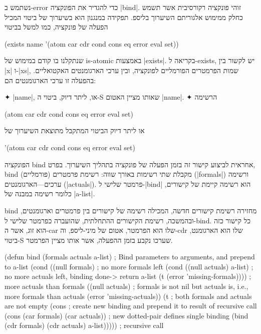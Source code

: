 נשתמש ב-error כדי להגדיר את הפונקציה \E|bind|. זוהי פונקציה רקורסיבית אשר תשמש כחלק
ממימוש אלגוריתם השיערוך בליספ. תפקידה במנגנון הוא בשיערוך של ביטוי המכיל הפעלה
של פונקציה, כמו למשל בביטוי 
\begin{LISP}
  (exists name '(atom car cdr cond cons eq error eval set))
\end{LISP}
שנתקלנו בו קודם במימוש של is-atomic באמצעות  \E|exists|. בקריאה ל-exists,
יש לקשור בין \E|x| ו-\E|xs|, שמות הפרמטרים הפורמליים לפונקציה, ובין ערכי
הארגומנטים האקטואליים. בהפעלה זו ערכי הארגומנטים הם:
\begin{itemize}
  ✦ \E|name|, או, ליתר דיוק, ביטוי ה-S שאותו מציין האטום \E|name|.
  ✦ הרשימה
  \begin{LISP} 
    (atom car cdr cond cons eq error eval set)
  \end{LISP}
  או ליתר דיוק הביטוי המתקבל מתוצאת השיערוך של
  \begin{LISP}
  '(atom car cdr cond cons eq error eval set)
  \end{LISP}
\end{itemize}

הפונקציה bind אחראית לביצוע קישור זה בזמן הפעלה של פונקציה בתהליך השיערוך.
בפרט, bind מקבלת שתי רשימות באורך שווה: רשימת פרמטרים (פורמליים) (\E|formals|)
ורשימה ערכים---הארגומנטים (\E|actuals|). פרמטר שלישי ל-\E|bind| הוא רשימה קיימת
של קישורים, כלומר רשימה במבנה של \E|a-list|. 

bind מחזירה רשימת קישורים חדשה, המכילה רשימה של קישורים בין פרמטרים וארגומנטים,
ובהמשכה, רשימת הקישורים ההתחלתית, שהועברה כפרמטר שלישי ל-bind. כל קישור כזה הוא
זוג, אשר ה-car שלו הוא הפרמטר, אטום של מיני-ליספ, וה-cdr שלו הוא הארגומנט, ביטוי-S 
שערכו נקבע בזמן ההפעלה, אשר אותו מציין הפרמטר. 

\begin{KERNEL}
(defun bind (formals actuals a-list) ; Bind parameters to arguments, and prepend to a-list
  (cond ((null formals) ; no more formals left
        (cond ((null actuals) a-list) ; no more actuals left, binding done-> return a-list
              (t (error 'missing-formals)))) ; more actuals than formals
        ((null actuals) ; formals is not nil but actuals is, i.e., more formals than actuals
          (error 'missing-actuals))
        (t ; both formals and actuals are not empty
          (cons ; create new binding and prepend it to result of recursive call
            (cons (car formals) (car actuals)) ; new dotted-pair defines single binding
            (bind (cdr formals) (cdr actuals) a-list))))) ; recursive call
\end{KERNEL}

